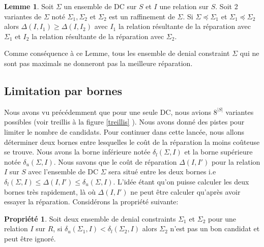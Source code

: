\documentclass[letterpaper, 12pt]{report}
\theoremstyle{definition}
\newtheorem{myprop}{Propriété}
\newtheorem{mylemma}{Lemme}
\begin{document}
\begin{mylemma}
 Soit $\Sigma$ un ensemble de DC sur $S$ et $I$ une relation sur $S$. Soit 2 variantes de $\Sigma$ noté $\Sigma_1,\Sigma_2$ et $\Sigma_2$ est un raffinement de $\Sigma$. Si $\Sigma \preceq \Sigma_1$ et $\Sigma_1 \preceq \Sigma_2$ alors $\Delta(I,I_1) \geq \Delta(I,I_2)$ avec $I_1$ la relation résultante de la réparation avec $\Sigma_1$ et $I_2$ la relation résultante de la réparation avec $\Sigma_2$.
\end{mylemma}

Comme conséquence à ce Lemme, tous les ensemble de denial constraint $\Sigma$ qui ne sont pas maximals ne donneront pas la meilleure réparation.

\subsection{Limitation par bornes}

Nous avons vu précédemment que pour une seule DC, nous avions $8^{|S|}$ variantes possibles (voir treillis à la figure \ref{treillis} ). Nous avons donné des pistes pour limiter le nombre de candidats. Pour continuer dans cette lancée, nous allons déterminer deux bornes entre lesquelles le coût de la réparation la moins coûteuse se trouve. Nous avons la borne inférieure notée $\delta_l(\Sigma,I)$ et la borne supérieure notée $\delta_u(\Sigma,I)$. Nous savons que le coût de réparation $\Delta(I,I')$ pour la relation $I$ sur $S$ avec l'ensemble de DC $\Sigma$ sera situé entre les deux bornes i.e $\delta_l(\Sigma,I) \leq \Delta(I,I') \leq \delta_u(\Sigma,I)$. L'idée étant qu'on puisse calculer les deux bornes très rapidement, là où $\Delta(I,I')$ ne peut être calculer qu'après avoir essayer la réparation. Considérons la propriété suivante:

\begin{myprop}
\label{boundRemove}
	Soit deux ensemble de denial constraints $\Sigma_1$ et $\Sigma_2$ pour une relation $I$ sur $R$, si $\delta_u(\Sigma_1,I) < \delta_l(\Sigma_2,I)$ alors $\Sigma_2$ n'est pas un bon candidat et peut être ignoré.
\end{myprop}
\end{document}
